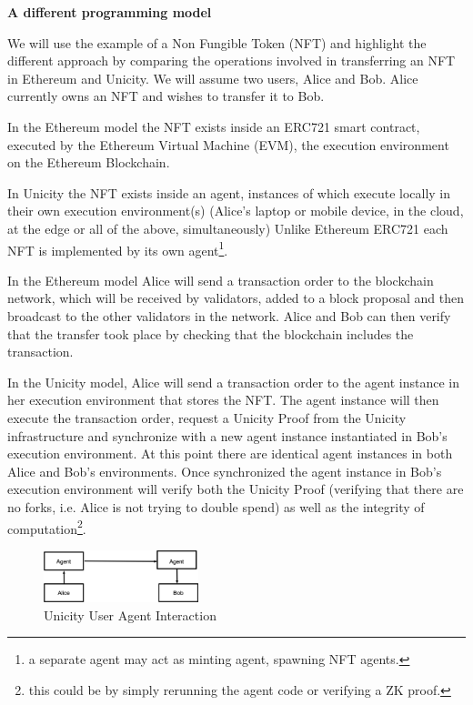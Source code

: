 \documentclass{article}
\begin{document}
\textbf{A different programming model}
\vspace{2mm}

We will use the example of a Non Fungible Token (NFT) and highlight the different approach by comparing the operations involved in transferring an NFT in Ethereum and Unicity.  We will assume two users, Alice and Bob. Alice currently owns an NFT and wishes to transfer it to Bob. \vspace{2mm}

In the Ethereum model the NFT exists inside an ERC721 smart contract, executed by the Ethereum Virtual Machine (EVM), the execution environment on the Ethereum Blockchain. 

\vspace{2mm}

In Unicity the NFT exists inside an agent, instances of which execute locally in their own execution environment(s) (Alice's laptop or mobile device, in the cloud, at the edge or all of the above, simultaneously) Unlike Ethereum ERC721 each NFT is implemented by its own agent\footnote{a separate agent may act as minting agent, spawning NFT agents.}.  
\vspace{2mm}

In the Ethereum model Alice will send a transaction order to the blockchain network, which will be received by validators, added to a block proposal and then broadcast to the other validators in the network. Alice and Bob can then verify that the transfer took place by checking that the blockchain includes the transaction.
\vspace{2mm}

In the Unicity model, Alice will send a transaction order to the agent instance in her execution environment that stores the NFT. The agent instance will then execute the transaction order, request a Unicity Proof from the Unicity infrastructure and synchronize with a new agent instance instantiated in Bob's execution environment. At this point there are identical agent instances in both Alice and Bob's environments. Once synchronized the agent instance in Bob's execution environment will verify both the Unicity Proof (verifying that there are no forks, i.e. Alice is not trying to double spend) as well as the integrity of computation\footnote{this could be by simply rerunning the agent code or verifying a ZK proof.}.

\begin{figure}[htbp]
    \centering
    \includegraphics[width=0.4\textwidth]{UserAgent.png}
    \caption{Unicity User Agent Interaction}
    \label{fig:UserAgent}
\end{figure}
\end{document}
